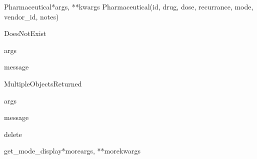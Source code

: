 \documentclass[letterpaper,10pt,english]{sphinxmanual}
\begin{document}
\hypertarget{data.models.Pharmaceutical}{}\begin{classdesc}{Pharmaceutical}{*args, **kwargs}
Pharmaceutical(id, drug, dose, recurrance, mode, vendor\_id, notes)

\hypertarget{data.models.Pharmaceutical.DoesNotExist}{}\begin{excdesc}{DoesNotExist}~

\hypertarget{data.models.Pharmaceutical.DoesNotExist.args}{}\begin{memberdesc}{args}\end{memberdesc}

\hypertarget{data.models.Pharmaceutical.DoesNotExist.message}{}\begin{memberdesc}{message}\end{memberdesc}
\end{excdesc}

\hypertarget{data.models.Pharmaceutical.MultipleObjectsReturned}{}\begin{excdesc}{MultipleObjectsReturned}~

\hypertarget{data.models.Pharmaceutical.MultipleObjectsReturned.args}{}\begin{memberdesc}{args}\end{memberdesc}

\hypertarget{data.models.Pharmaceutical.MultipleObjectsReturned.message}{}\begin{memberdesc}{message}\end{memberdesc}
\end{excdesc}

\hypertarget{data.models.Pharmaceutical.delete}{}\begin{methoddesc}[Pharmaceutical]{delete}{}\end{methoddesc}

\hypertarget{data.models.Pharmaceutical.get_mode_display}{}\begin{methoddesc}[Pharmaceutical]{get\_mode\_display}{*moreargs, **morekwargs}\end{methoddesc}


\end{classdesc}
\end{document}
